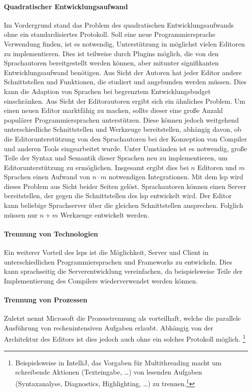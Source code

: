 \paragraph{Quadratischer Entwicklungsaufwand}
Im Vordergrund stand das Problem des quadratischen Entwicklungsaufwands ohne ein standardisiertes Protokoll.
Soll eine neue Programmiersprache Verwendung finden, ist es notwendig, Unterstützung in möglichst vielen Editoren zu implementieren.
Dies ist teilweise durch Plugins möglich, die von den Sprachautoren bereitgestellt werden können, aber mitunter signifikanten Entwicklungsaufwand benötigen.
Aus Sicht der Autoren hat jeder Editor andere Schnittstellen und Funktionen, die studiert und angebunden werden müssen.
Dies kann die Adaption von Sprachen bei begrenztem Entwicklungsbudget einschränken.
Aus Sicht der Editorautoren ergibt sich ein ähnliches Problem.
Um einen neuen Editor marktfähig zu machen, sollte dieser eine große Anzahl populärer Programmiersprachen unterstützen.
Diese können jedoch weitgehend unterschiedliche Schnittstellen und Werkzeuge bereitstellen, abhängig davon, ob die Editorunterstützung von den Sprachautoren bei der Konzeption von Compiler und anderen Tools eingearbeitet wurde.
Unter Umständen ist es notwendig, große Teile der Syntax und Semantik dieser Sprachen neu zu implementieren, um Editorunterstützung zu ermöglichen.
Insgesamt ergibt dies bei $n$ Editoren und $m$ Sprachen einen Aufwand von $n \cdot m$ notwendigen Integrationen.
Mit dem \ac{lsp} wird dieses Problem aus Sicht beider Seiten gelöst.
Sprachautoren können einen Server bereitstellen, der gegen die Schnittstellen des \ac{lsp} entwickelt wird.
Der Editor kann beliebige Sprachserver über die gleichen Schnittstellen ansprechen.
Folglich müssen nur $n + m$ Werkzeuge entwickelt werden.\cite{why-lsp}

\paragraph{Trennung von Technologien}
Ein weiterer Vorteil des \acp{lsp} ist die Möglichkeit, Server und Client in unterschiedlichen Programmiersprachen und Frameworks zu entwickeln.
Dies kann sprachseitig die Serverentwicklung vereinfachen, da beispielsweise Teile der Implementierung des Compilers wiederverwendet werden können.\cite{why-lsp}

\paragraph{Trennung von Prozessen}
Zuletzt nennt Microsoft die Prozesstrennung als vorteilhaft, welche die parallele Ausführung von rechenintensiven Aufgaben erlaubt.\cite{why-lsp}
Abhängig von der Architektur des Editors ist dies jedoch auch ohne ein solches Protokoll möglich.
\footnote{Beispielsweise in IntelliJ, das Vorgaben für Multithreading macht um schreibende Aktionen (Texteingabe, \ldots) von lesenden Aufgaben (Syntaxanalyse, Diagnostics, Highlighting, \ldots) zu trennen.\footnote{\url{https://plugins.jetbrains.com/docs/intellij/general-threading-rules.html}}}


